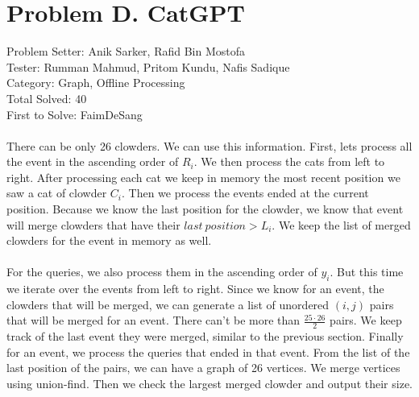 \section*{Problem D. CatGPT}
Problem Setter: Anik Sarker,  Rafid Bin Mostofa\\
Tester: Rumman Mahmud, Pritom Kundu, Nafis Sadique \\
Category: Graph, Offline Processing \\
Total Solved: 40 \\
First to Solve: FaimDeSang \\
\\
There can be only 26 clowders. We can use this information. First, lets process
all the event in the ascending order of $R_i$. We then process the cats from left
to right. After processing each cat we keep in memory the most recent position we 
saw a cat of clowder $C_i$. Then we process the events ended at the current position.
Because we know the last position for the clowder, we know that event will merge
clowders that have their $last\ position > L_i$. We keep the list of merged clowders
for the event in memory as well.\\
\\
For the queries, we also process them in the ascending order of $y_i$. But this time we 
iterate over the events from left to right. Since we know for an event, the clowders that
will be merged, we can generate a list of unordered $(i,j)$ pairs that will be merged for
an event. There can't be more than $\frac{25 \cdot 26}{2}$ pairs. We keep track of the last event
they were merged, similar to the previous section. Finally for an event, we process the 
queries that ended in that event. From the list of the last position of the pairs, we
can have a graph of 26 vertices. We merge vertices using union-find. Then we check the largest
merged clowder and output their size.
